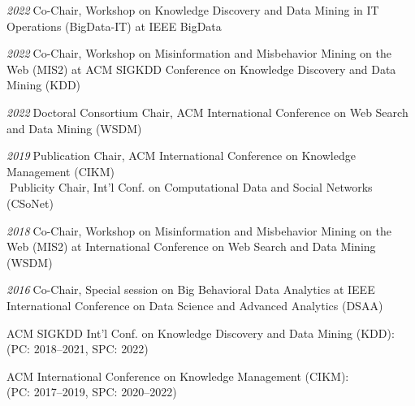 \documentclass[10pt]{article}
\newenvironment{myindentpar}[1]%
{\begin{list}{}%
         {\setlength{\leftmargin}{#1}}%
         \item[]%
}
{\end{list}}
\newcounter{list}
\begin{document}
\begin{myindentpar}{0.75cm}

\hspace{-0.75cm}{\bf Organizing Committee}

{\small

\hspace{-0.75cm}\textit{2022}\textcolor{white}{.}Co-Chair, Workshop on Knowledge Discovery and Data Mining in IT Operations (BigData-IT) at IEEE BigData

\hspace{-0.75cm}\textit{2022}\textcolor{white}{.}Co-Chair, Workshop on Misinformation and Misbehavior Mining on the Web (MIS2) at ACM SIGKDD Conference on Knowledge Discovery and Data Mining (KDD)

\hspace{-0.75cm}\textit{2022}\textcolor{white}{.}Doctoral Consortium Chair, ACM International Conference on Web Search and Data Mining (WSDM)

\hspace{-0.75cm}\textit{2019}\textcolor{white}{.}Publication Chair, ACM International Conference on Knowledge Management (CIKM) \\
\textcolor{white}{.}Publicity Chair, Int'l Conf. on Computational Data and Social Networks (CSoNet)

\hspace{-0.75cm}\textit{2018}\textcolor{white}{.}Co-Chair, Workshop on Misinformation and Misbehavior Mining on the Web (MIS2) at International Conference on Web Search and Data Mining (WSDM)

\hspace{-0.75cm}\textit{2016}\textcolor{white}{.}Co-Chair, Special session on Big Behavioral Data Analytics at IEEE International Conference on Data Science and Advanced Analytics (DSAA)

}

\hspace{-0.75cm}{\bf (Senior) Program Committee / Reviewer / (Senior) Area Chair}

{\small

\hspace{-0.75cm}ACM SIGKDD Int'l Conf. on Knowledge Discovery and Data Mining (KDD): \\
(PC: 2018--2021, SPC: 2022)

\hspace{-0.75cm}ACM International Conference on Knowledge Management (CIKM): \\
(PC: 2017--2019, SPC: 2020--2022)

}
\end{myindentpar}
\end{document}
